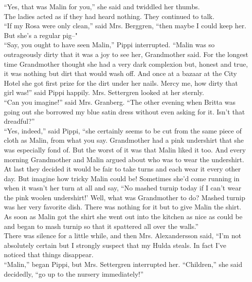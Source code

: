 \documentclass{standard}
\begin{document}
“Yes, that was Malin for you,” she said and twiddled her thumbs.\\

The ladies acted as if they had heard nothing. They continued to talk.\\

“If my Rosa were only clean,” said Mrs. Berggren, “then maybe I could keep her. But she’s a regular pig--"\\

“Say, you ought to have seen Malin,” Pippi interrupted. “Malin was so outrageously dirty that it was a joy to see her, Grandmother said. For the longest time Grandmother thought she had a very dark complexion but, honest and true, it was nothing but dirt that would wash off. And once at a bazaar at the City Hotel she got first prize for the dirt under her nails. Mercy me, how dirty that girl was!” said Pippi happily. Mrs. Settergren looked at her sternly.\\

“Can you imagine!” said Mrs. Granberg. “The other evening when Britta was going out she borrowed my blue satin dress without even asking for it. Isn’t that dreadful?”\\

“Yes, indeed,” said Pippi, “she certainly seems to be cut from the same piece of cloth as Malin, from what you say. Grandmother had a pink undershirt that she was especially fond of. But the worst of it was that Malin liked it too. And every morning Grandmother and Malin argued about who was to wear the undershirt. At last they decided it would be fair to take turns and each wear it every other day. But imagine how tricky Malin could be! Sometimes she’d come running in when it wasn’t her turn at all and say, “No mashed turnip today if I can’t wear the pink woolen undershirt!’ Well, what was Grandmother to do? Mashed turnip was her very favorite dish. There was nothing for it but to give Malin the shirt. As soon as Malin got the shirt she went out into the kitchen as nice as could be and began to mash turnip so that it spattered all over the walls.”\\

There was silence for a little while, and then Mrs. Alexandersson said, “I’m not absolutely certain but I strongly suspect that my Hulda steals. In fact I’ve noticed that things disappear.\\

“Malin,” began Pippi, but Mrs. Settergren interrupted her. “Children,” she said decidedly, “go up to the nursery immediately!”\\
\end{document}

